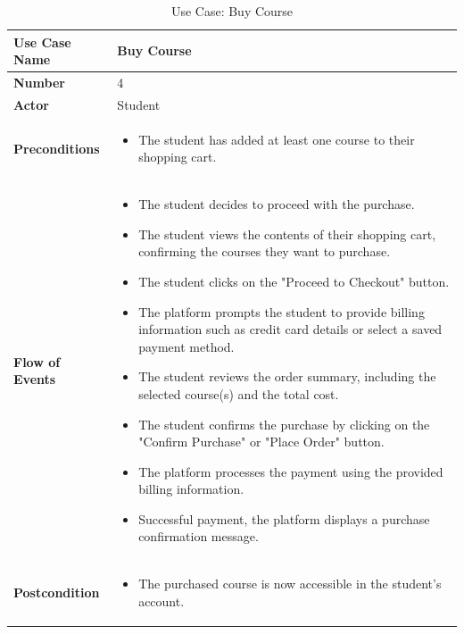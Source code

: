 \newpage

\begin{table}[h!]
    \centering
    \caption{Use Case: Buy Course}
    \bgroup
    \def\arraystretch{1}%
    \begin{tabular}{|m{4cm}|m{11cm}|}
        \hline
        \textbf{Use Case Name} & Buy Course \\
        \hline
        \textbf{Number} & 4 \\
        \hline
        \textbf{Actor} & Student \\
        \hline
        \textbf{Preconditions} & 
        \begin{itemize}[noitemsep,topsep=0pt] %
            \item The student has added at least one course to their shopping cart.
        \end{itemize} \\
        \hline
        \textbf{Flow of Events} & 
        \begin{itemize}[noitemsep,topsep=0pt]
            \item The student decides to proceed with the purchase.
            \item The student views the contents of their shopping cart, confirming the courses they want to purchase.
            \item The student clicks on the "Proceed to Checkout" button.
            \item The platform prompts the student to provide billing information such as credit card details or select a saved payment method.
            \item The student reviews the order summary, including the selected course(s) and the total cost.
            \item The student confirms the purchase by clicking on the "Confirm Purchase" or "Place Order" button.
            \item The platform processes the payment using the provided billing information.
            \item Successful payment, the platform displays a purchase confirmation message.
        \end{itemize} \\
        \hline
        \textbf{Postcondition} & 
        \begin{itemize}[noitemsep,topsep=0pt]
            \item The purchased course is now accessible in the student's account.

\end{itemize}
\end{tabular}
\end{table}
